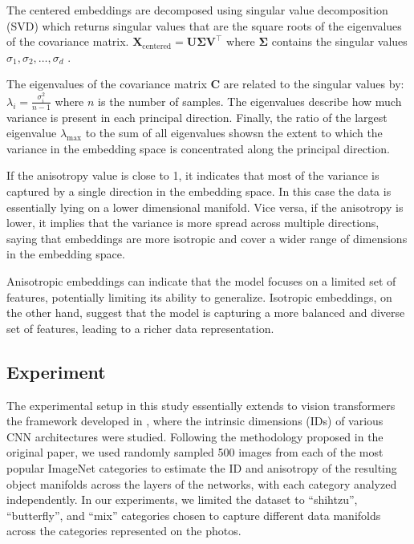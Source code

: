 \documentclass[
  11pt,
  a4paper,
  onecolumn]{article}
\begin{document}
The centered embeddings are decomposed using singular value decomposition (SVD) which returns singular values that are the square roots of the eigenvalues of the covariance matrix.
$
\mathbf{X}_{\text{centered}} = \mathbf{U} \mathbf{\Sigma} \mathbf{V}^\top
$
where $\mathbf{\Sigma}$ contains the singular values $\sigma_1, \sigma_2, \ldots, \sigma_d$ .

The eigenvalues of the covariance matrix $\mathbf{C}$ are related to the singular values by:
$
\lambda_i = \frac{\sigma_i^2}{n - 1}
$
where $n$ is the number of samples. The eigenvalues describe how much variance is present in each principal direction. Finally, the ratio of the largest eigenvalue $\lambda_{\text{max}}$ to the sum of all eigenvalues showsn the extent to which the variance in the embedding space is concentrated along the principal direction.

If the anisotropy value is close to 1, it indicates that most of the variance is captured by a single direction in the embedding space. In this case the data is essentially lying on a lower dimensional manifold. Vice versa, if the anisotropy is lower, it implies that the variance is more spread across multiple directions, saying that embeddings are more isotropic and cover a wider range of dimensions in the embedding space.

Anisotropic embeddings can indicate that the model focuses on a limited set of features, potentially limiting its ability to generalize. Isotropic embeddings, on the other hand, suggest that the model is capturing a more balanced and diverse set of features, leading to a richer data representation.


\subsection{Experiment}

The experimental setup in this study  essentially extends to vision transformers the framework developed in \cite{ansuini2019intrinsic}, where the intrinsic dimensions (IDs) of various CNN architectures were studied. Following the methodology proposed in the original paper, we used randomly sampled 500 images from each of the most popular ImageNet categories to estimate the ID and anisotropy of the resulting object manifolds across the layers of the networks, with each category analyzed independently. In our experiments, we limited the dataset to “shihtzu”, “butterfly”, and “mix” categories chosen to capture different data manifolds across the categories represented on the photos.
\end{document}

